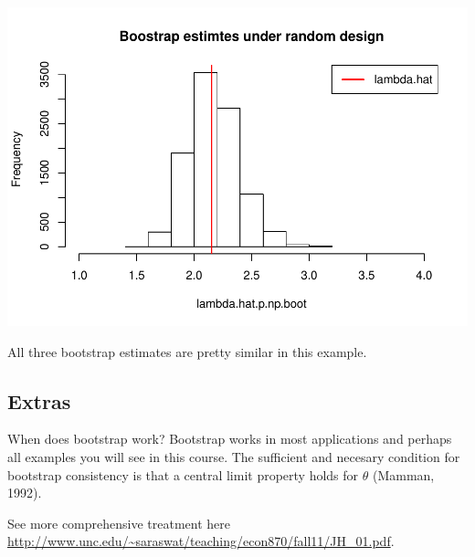 \documentclass[]{article}
\begin{document}
\includegraphics{Stats406Lab11_files/figure-latex/unnamed-chunk-7-1.pdf}

All three bootstrap estimates are pretty similar in this example.

\subsection{Extras}\label{extras}

When does bootstrap work? Bootstrap works in most applications and
perhaps all examples you will see in this course. The sufficient and
necesary condition for bootstrap consistency is that a central limit
property holds for \(\hat\theta\) (Mamman, 1992).

See more comprehensive treatment here
\url{http://www.unc.edu/~saraswat/teaching/econ870/fall11/JH_01.pdf}.
\end{document}

